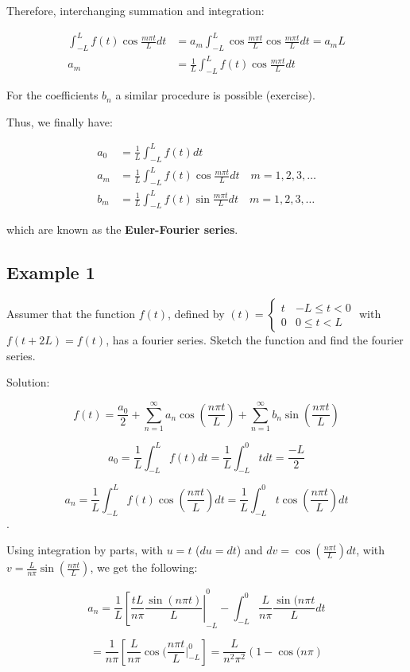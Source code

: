 Therefore, interchanging summation and integration:

$$
\begin{aligned}
\int_{-L}^{L} f(t) \cos \frac{m \pi t}{L} d t &=a_{m} \int_{-L}^{L} \cos \frac{m \pi t}{L} \cos \frac{m \pi t}{L} d t=a_{m} L \\
a_{m} &=\frac{1}{L} \int_{-L}^{L} f(t) \cos \frac{m \pi t}{L} d t
\end{aligned}
$$

For the coefficients $b_n$ a similar procedure is possible (exercise). 

Thus, we finally have:

$$
\begin{aligned}
a_{0} &=\frac{1}{L} \int_{-L}^{L} f(t) d t \\
a_{m} &=\frac{1}{L} \int_{-L}^{L} f(t) \cos \frac{m \pi t}{L} d t \quad m=1,2,3, \ldots \\
b_{m} &=\frac{1}{L} \int_{-L}^{L} f(t) \sin \frac{m \pi t}{L} d t \quad m=1,2,3, \ldots
\end{aligned}
$$

which are known as the \textbf{Euler-Fourier series}. 

\subsection{Example 1}
\begin{center}
    Assumer that the function $f(t)$, defined by $(t) = \left\{ \begin{matrix} t & -L \leq t < 0 \\ 0 & 0 \leq t < L \end{matrix} \right.$ with $ f(t + 2L) = f(t)$, has a fourier series. Sketch the function and find the fourier series. 
\end{center}

Solution:

$$f(t) = \frac{a_0}{2} + \sum_{n = 1}^\infty a_n \cos(\frac{n \pi t}{L}) + \sum_{n = 1}^\infty b_n \sin(\frac{n \pi t}{L})$$

$$a_0 = \frac{1}{L} \int_{-L}^L f(t) dt = \frac{1}{L} \int_{-L}^0 t dt = \frac{-L}{2}$$

$$a_n = \frac{1}{L} \int_{-L}^L f(t) \cos(\frac{n \pi t}{L}) dt = \frac{1}{L} \int_{-L}^0 t \cos (\frac{n \pi t}{L}) dt$$. 

Using integration by parts, with $u = t$ ($du = dt$) and $dv = \cos(\frac{n \pi t}{L}) dt$, with $v = \frac{L}{n \pi} \sin(\frac{n \pi t}{L})$, we get the following:

$$a_n = \frac{1}{L} \left[\frac{tL}{n \pi} \frac{\sin(n \pi t)}{L} \right|_{-L}^0 - \int_{-L}^{0} \frac{L}{n \pi} \frac{\sin(n \pi t}{L} dt$$

$$ = \frac{1}{n \pi} \left[ \frac{L}{n \pi} \cos(\frac{n \pi t}{L} |_{-L}^{0} \right] = \frac{L}{n^2 \pi^2} \left(1 - \cos(n \pi \right)$$